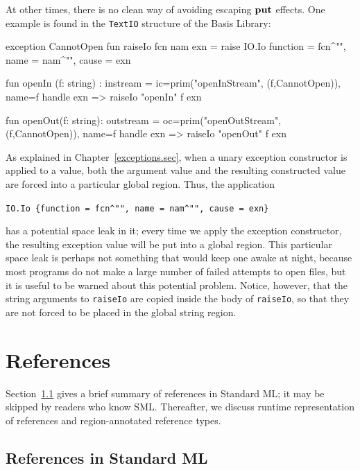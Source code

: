 \documentclass[12pt]{book}
\begin{document}
At other times, there is no clean way of avoiding escaping $\mathop{\bf put}\nolimits$ effects.  One
example is found in the
%
%
%
%
%
\lstinline{TextIO} structure of the Basis Library:
\begin{smlcode}
  exception CannotOpen
  fun raiseIo fcn nam exn =
    raise IO.Io {function = fcn^"", name = nam^"", cause = exn}

  fun openIn (f: string) : instream =
    {ic=prim("openInStream", (f,CannotOpen)),
     name=f} handle exn => raiseIo "openIn" f exn

  fun openOut(f: string): outstream =
    {oc=prim("openOutStream", (f,CannotOpen)),
     name=f} handle exn => raiseIo "openOut" f exn
\end{smlcode}
As explained in Chapter~\ref{exceptions.sec}, when a unary exception constructor
is applied to a value, both the argument value and the resulting constructed
value are forced into a particular global region. Thus, the application
\begin{center}
  \lstinline!IO.Io {function = fcn^"", name = nam^"", cause = exn}!
\end{center}
has a potential space leak in it; every time we apply the exception constructor,
the resulting exception value will be put into a global region. This particular
space leak is perhaps not something that would keep one awake at night, because
most programs do not make a large number of failed attempts to open files, but
it is useful to be warned about this potential problem.  Notice, however, that
the string arguments to \lstinline{raiseIo} are copied inside the body of
\lstinline{raiseIo}, so that they are not forced to be placed in the global
string region.

\chapter{References}
\label{refs.sec}
Section~\ref{refbasics.sec} gives a brief summary of references in Standard ML;
it may be skipped by readers who know SML.  Thereafter, we discuss runtime
representation of references and region-annotated reference types.

\section{References in Standard ML}
\label{refbasics.sec}
\end{document}
